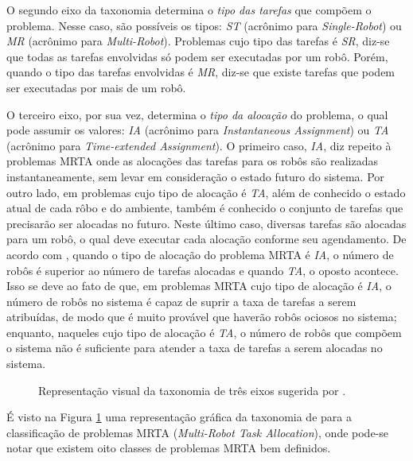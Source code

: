             O segundo eixo da taxonomia determina o \textit{tipo das tarefas} que compõem o problema. Nesse caso, são possíveis os tipos: \textit{ST} (acrônimo para \textit{Single-Robot}) ou \textit{MR} (acrônimo para \textit{Multi-Robot}). Problemas cujo tipo das tarefas é \textit{SR}, diz-se que todas as tarefas envolvidas só podem ser executadas por um robô. Porém, quando o tipo das tarefas envolvidas é \textit{MR}, diz-se que existe tarefas que podem ser executadas por mais de um robô.
            
            O terceiro eixo, por sua vez, determina o \textit{tipo da alocação} do problema, o qual pode assumir os valores: \textit{IA} (acrônimo para \textit{Instantaneous Assignment}) ou \textit{TA} (acrônimo para \textit{Time-extended Assignment}). O primeiro caso, \textit{IA}, diz repeito à problemas MRTA onde as alocações das tarefas para os robôs são realizadas instantaneamente, sem levar em consideração o estado futuro do sistema. Por outro lado, em problemas cujo tipo de alocação é \textit{TA}, além de conhecido o estado atual de cada rôbo e do ambiente, também é conhecido o conjunto de tarefas que precisarão ser alocadas no futuro. Neste último caso, diversas tarefas são alocadas para um robô, o qual deve executar cada alocação conforme seu agendamento. De acordo com \cite{ref:bastos2008utility}, quando o tipo de alocação do problema MRTA é \textit{IA}, o número de robôs é superior ao número de tarefas alocadas e quando \textit{TA}, o oposto acontece. Isso se deve ao fato de que, em problemas MRTA cujo tipo de alocação é \textit{IA}, o número de robôs no sistema é capaz de suprir a taxa de tarefas a serem atribuídas, de modo que é muito provável que haverão robôs ociosos no sistema; enquanto, naqueles cujo tipo de alocação é \textit{TA}, o número de robôs que compõem o sistema não é suficiente para atender a taxa de tarefas a serem alocadas no sistema.
            
            \begin{figure}[htb]
                \centering
                
                \caption[Representação visual da taxonomia de três eixos]{Representação visual da taxonomia de três eixos sugerida por .} \label{fig:taxomia_mrta}
            \end{figure}
            
            É visto na Figura \ref{fig:taxomia_mrta} uma representação gráfica da taxonomia de \cite{ref:gerkey2004taxonomy} para a classificação de problemas MRTA (\textit{Multi-Robot Task Allocation}), onde pode-se notar que existem oito classes de problemas MRTA bem definidos.
            
